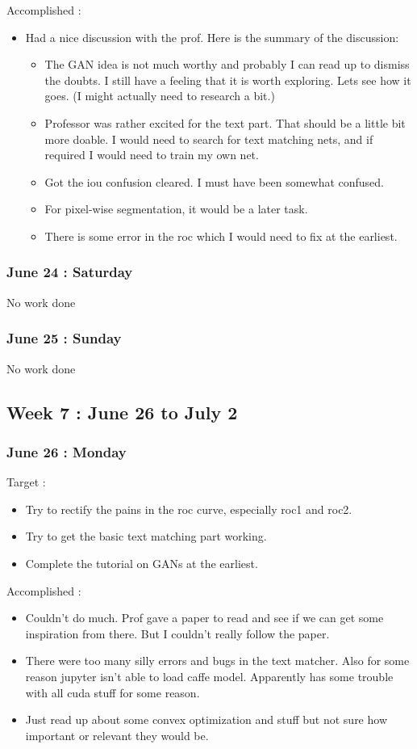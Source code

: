 \documentclass{article}
\begin{document}
Accomplished :
\begin{itemize}
\item Had a nice discussion with the prof. Here is the summary of the discussion:
  \begin{itemize}
  \item The GAN idea is not much worthy and probably I can read up to dismiss the doubts. I still have a feeling that it is worth exploring. Lets see how it goes. (I might actually need to research a bit.)
  \item Professor was rather excited for the text part. That should be a little bit more doable. I would need to search for text matching nets, and if required I would need to train my own net.
  \item Got the iou confusion cleared. I must have been somewhat confused.
  \item For pixel-wise segmentation, it would be a later task.
  \item There is some error in the roc which I would need to fix at the earliest.
  \end{itemize}
\end{itemize}

\subsubsection{June 24 : Saturday}
No work done

\subsubsection{June 25 : Sunday}
No work done

\subsection{Week 7 : June 26 to July 2}
\subsubsection{June 26 : Monday}
Target :
\begin{itemize}
\item Try to rectify the pains in the roc curve, especially roc1 and roc2.
\item Try to get the basic text matching part working.
\item Complete the tutorial on GANs at the earliest.
\end{itemize}

Accomplished :
\begin{itemize}
\item Couldn't do much. Prof gave a paper to read and see if we can get some inspiration from there. But I couldn't really follow the paper.
\item There were too many silly errors and bugs in the text matcher. Also for some reason jupyter isn't able to load caffe model. Apparently has some trouble with all cuda stuff for some reason.
\item Just read up about some convex optimization and stuff but not sure how important or relevant they would be.
\end{itemize}
\end{document}
